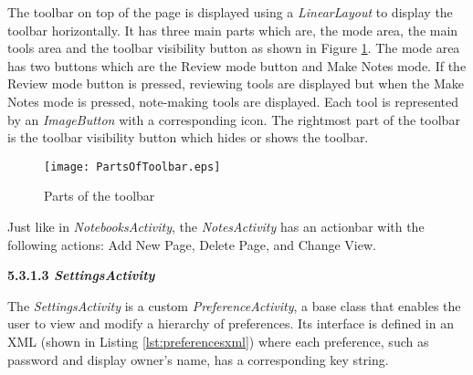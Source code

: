 The toolbar on top of the page is displayed using a \textit{LinearLayout} to display the toolbar horizontally. It has three main parts which are, the mode area, the main tools area and the toolbar visibility button as shown in Figure \ref{fig:toolbar}. The mode area has two buttons which are the Review mode button and Make Notes mode. If the Review mode button is pressed, reviewing tools are displayed but when the Make Notes mode is pressed, note-making tools are displayed. Each tool is represented by an \textit{ImageButton} with a corresponding icon. The rightmost part of the toolbar is the toolbar visibility button which hides or shows the toolbar.

\begin{figure}[htbp!]       
   \centering              
   \texttt{[image: PartsOfToolbar.eps]} 
   \caption{Parts of the toolbar}
   \label{fig:toolbar}
\end{figure}

Just like in \textit{NotebooksActivity}, the \textit{NotesActivity} has an actionbar with the following actions: Add New Page, Delete Page, and Change View.

\begin{flushleft}
\textbf{5.3.1.3 \textit{SettingsActivity}}
\end{flushleft}

\begin{raggedright}
The \textit{SettingsActivity} is a custom \textit{PreferenceActivity}, a base class that enables the user to view and modify a hierarchy of preferences. Its interface is defined in an XML (shown in Listing \ref{lst:preferencesxml}) where each preference, such as password and display owner's name, has a corresponding key string. 
\end{raggedright}

